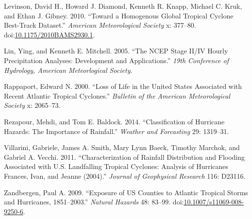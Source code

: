 \documentclass[]{elsarticle} %
\begin{document}
\hypertarget{ref-Levinson2010}{}
Levinson, David H., Howard J. Diamond, Kenneth R. Knapp, Michael C.
Kruk, and Ethan J. Gibney. 2010. ``Toward a Homogenous Global Tropical
Cyclone Best-Track Dataset.'' \emph{American Meteorological Society} x:
377--80.
doi:\href{https://doi.org/10.1175/2010BAMS2930.1}{10.1175/2010BAMS2930.1}.

\hypertarget{ref-Lin2005}{}
Lin, Ying, and Kenneth E. Mitchell. 2005. ``The NCEP Stage II/IV Hourly
Precipitation Analyses: Development and Applications.'' \emph{19th
Conference of Hydrology, American Meteorlogical Society}.

\hypertarget{ref-Rappaport2000}{}
Rappaport, Edward N. 2000. ``Loss of Life in the United States
Associated with Recent Atlantic Tropical Cyclones.'' \emph{Bulletin of
the American Meteorological Society} x: 2065--73.

\hypertarget{ref-Rezapour2014}{}
Rezapour, Mehdi, and Tom E. Baldock. 2014. ``Classification of Hurricane
Hazards: The Importance of Rainfall.'' \emph{Weather and Forcasting} 29:
1319--31.

\hypertarget{ref-Villarini2011}{}
Villarini, Gabriele, James A. Smith, Mary Lynn Baeck, Timothy Marchok,
and Gabriel A. Vecchi. 2011. ``Characterization of Rainfall Distribution
and Flooding Associated with U.S. Landfalling Tropical Cyclones:
Analysis of Hurricanes Frances, Ivan, and Jeanne (2004).'' \emph{Journal
of Geophysical Research} 116: D23116.

\hypertarget{ref-Zandbergen2009}{}
Zandbergen, Paul A. 2009. ``Exposure of US Counties to Atlantic Tropical
Storms and Hurricanes, 1851--2003.'' \emph{Natural Hazards} 48: 83--99.
doi:\href{https://doi.org/10.1007/s11069-008-9250-6}{10.1007/s11069-008-9250-6}.
\end{document}

